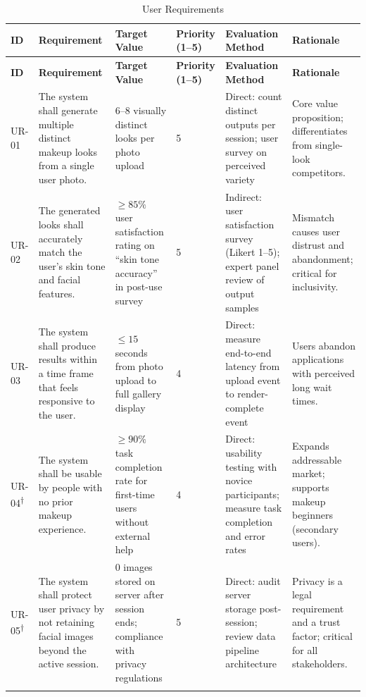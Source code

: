 \documentclass[11pt, letterpaper]{article}
\begin{document}
\begin{longtable}{>{\centering}p{0.8cm} p{3.2cm} p{3cm} p{1.2cm} p{2cm} p{2.5cm}}
\caption{User Requirements} \\
\toprule
\textbf{ID} & \textbf{Requirement} & \textbf{Target Value} & \textbf{Priority (1--5)} & \textbf{Evaluation Method} & \textbf{Rationale} \\
\midrule
\endfirsthead
\toprule
\textbf{ID} & \textbf{Requirement} & \textbf{Target Value} & \textbf{Priority (1--5)} & \textbf{Evaluation Method} & \textbf{Rationale} \\
\midrule
\endhead

UR-01 &
The system shall generate multiple distinct makeup looks from a single user photo. &
6--8 visually distinct looks per photo upload &
5 &
Direct: count distinct outputs per session; user survey on perceived variety &
Core value proposition; differentiates from single-look competitors. \\
\addlinespace
\midrule

UR-02 &
The generated looks shall accurately match the user's skin tone and facial features. &
$\geq 85\%$ user satisfaction rating on ``skin tone accuracy'' in post-use survey &
5 &
Indirect: user satisfaction survey (Likert 1--5); expert panel review of output samples &
Mismatch causes user distrust and abandonment; critical for inclusivity. \\
\addlinespace
\midrule

UR-03 &
The system shall produce results within a time frame that feels responsive to the user. &
$\leq 15$ seconds from photo upload to full gallery display &
4 &
Direct: measure end-to-end latency from upload event to render-complete event &
Users abandon applications with perceived long wait times. \\
\addlinespace
\midrule

UR-04\textsuperscript{$\dagger$} &
The system shall be usable by people with no prior makeup experience. &
$\geq 90\%$ task completion rate for first-time users without external help &
4 &
Direct: usability testing with novice participants; measure task completion and error rates &
Expands addressable market; supports makeup beginners (secondary users). \\
\addlinespace
\midrule

UR-05\textsuperscript{$\dagger$} &
The system shall protect user privacy by not retaining facial images beyond the active session. &
0 images stored on server after session ends; compliance with privacy regulations &
5 &
Direct: audit server storage post-session; review data pipeline architecture &
Privacy is a legal requirement and a trust factor; critical for all stakeholders. \\
\addlinespace
\midrule


\end{longtable}
\end{document}
